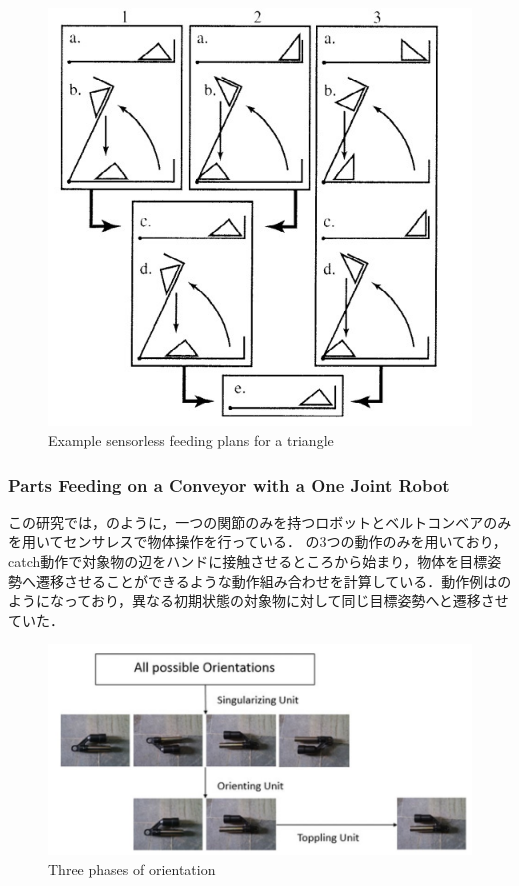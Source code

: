 \documentclass[a4paper,twoside,12pt,papersize, dvipdfmx]{iirthesis}
\begin{document}
\begin{figure}[b]
\begin{minipage}{0.5\hsize}
\includegraphics[width=0.9\hsize]{fig/1-introduction/Akella/sensorless_result.jpg}
\caption{Example sensorless feeding plans for a triangle \cite{akella2000}}
\label{fig::sensres}
\end{minipage}
\end{figure}
\subsubsection{Parts Feeding on a Conveyor with a One Joint Robot \cite{akella2000}}
この研究では，のように，一つの関節のみを持つロボットとベルトコンベアのみを用いてセンサレスで物体操作を行っている．
の3つの動作のみを用いており，catch動作で対象物の辺をハンドに接触させるところから始まり，物体を目標姿勢へ遷移させることができるような動作組み合わせを計算している．動作例はのようになっており，異なる初期状態の対象物に対して同じ目標姿勢へと遷移させていた．


\begin{figure}[b]
\centering
\includegraphics[width=0.6\hsize]{fig/1-introduction/Udhayakumar/threephase.jpg}
\caption{Three phases of orientation \cite{Udhayakumar}}
\label{fig::three}
\end{figure}
\end{document}
